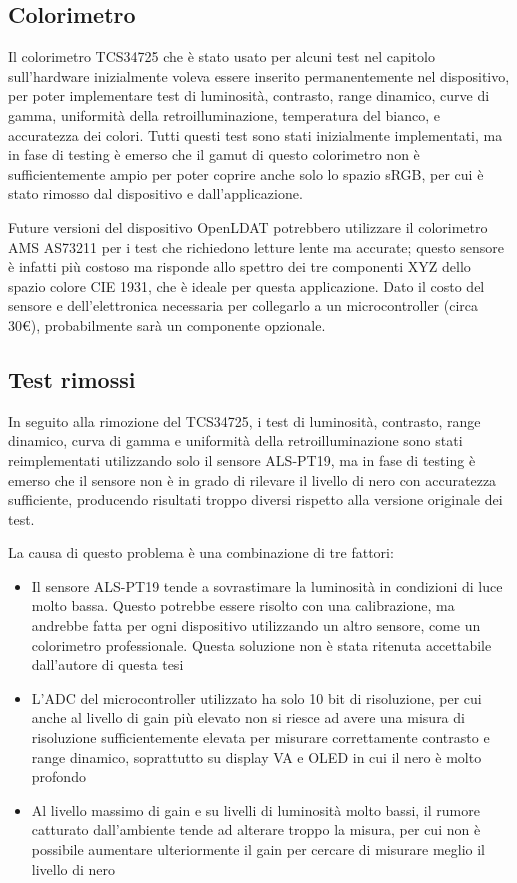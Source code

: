 \subsection{Colorimetro}
Il colorimetro TCS34725 che è stato usato per alcuni test nel capitolo sull'hardware inizialmente voleva essere inserito permanentemente nel dispositivo, per poter implementare test di luminosità, contrasto, range dinamico, curve di gamma, uniformità della retroilluminazione, temperatura del bianco, e accuratezza dei colori. Tutti questi test sono stati inizialmente implementati, ma in fase di testing è emerso che il gamut di questo colorimetro non è sufficientemente ampio per poter coprire anche solo lo spazio sRGB, per cui è stato rimosso dal dispositivo e dall'applicazione.

Future versioni del dispositivo OpenLDAT potrebbero utilizzare il colorimetro AMS AS73211 per i test che richiedono letture lente ma accurate; questo sensore è infatti più costoso ma risponde allo spettro dei tre componenti XYZ dello spazio colore CIE 1931, che è ideale per questa applicazione. Dato il costo del sensore e dell'elettronica necessaria per collegarlo a un microcontroller (circa 30€), probabilmente sarà un componente opzionale.

\subsection{Test rimossi}
In seguito alla rimozione del TCS34725, i test di luminosità, contrasto, range dinamico, curva di gamma e uniformità della retroilluminazione sono stati reimplementati utilizzando solo il sensore ALS-PT19, ma in fase di testing è emerso che il sensore non è in grado di rilevare il livello di nero con accuratezza sufficiente, producendo risultati troppo diversi rispetto alla versione originale dei test.

La causa di questo problema è una combinazione di tre fattori:\begin{itemize}
	\item Il sensore ALS-PT19 tende a sovrastimare la luminosità in condizioni di luce molto bassa. Questo potrebbe essere risolto con una calibrazione, ma andrebbe fatta per ogni dispositivo utilizzando un altro sensore, come un colorimetro professionale. Questa soluzione non è stata ritenuta accettabile dall'autore di questa tesi
	\item L'ADC del microcontroller utilizzato ha solo 10 bit di risoluzione, per cui anche al livello di gain più elevato non si riesce ad avere una misura di risoluzione sufficientemente elevata per misurare correttamente contrasto e range dinamico, soprattutto su display VA e OLED in cui il nero è molto profondo
	\item Al livello massimo di gain e su livelli di luminosità molto bassi, il rumore catturato dall'ambiente tende ad alterare troppo la misura, per cui non è possibile aumentare ulteriormente il gain per cercare di misurare meglio il livello di nero
\end{itemize}

